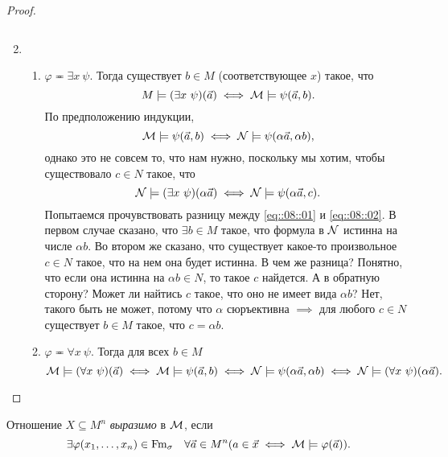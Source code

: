 \begin{proof}
\begin{enumerate}
\begin{enumerate}
$$        $$
        \end{enumerate}
        \item \begin{enumerate}
            \item $\varphi \eqcirc \exists x~ \psi$.
        Тогда существует $b \in M$ (соответствующее $x$) такое, что
        $$
            M \models (\exists x~\psi)(\vec{a}) \iff \mathcal{M} \models \psi(\vec{a}, b).
        $$
        По предположению индукции,
        \begin{equation} \label{eq::08::01}
            \mathcal{M} \models \psi(\vec{a}, b) \iff \mathcal{N} \models \psi (\alpha \vec{a}, \alpha b),
        \end{equation}
        однако это не совсем то, что нам нужно, поскольку мы хотим, чтобы существовало $c \in N$ такое, что
        \begin{equation} \label{eq::08::02}
            \mathcal{N} \models (\exists x~\psi)(\alpha \vec{a}) \iff \mathcal{N} \models \psi(\alpha \vec{a}, c).
        \end{equation}
        Попытаемся прочувствовать разницу между \eqref{eq::08::01} и \eqref{eq::08::02}.
        В первом случае сказано, что $\exists b \in M$ такое, что формула в $\mathcal{N}$ истинна на числе $\alpha b$.
        Во втором же сказано, что существует какое-то произвольное $c \in N$ такое, что на нем она будет истинна.
        В чем же разница?
        Понятно, что если она истинна на $\alpha b \in N$, то такое $c$ найдется.
        А в обратную сторону?
        Может ли найтись $c$ такое, что оно не имеет вида $\alpha b$?
        Нет, такого быть не может, потому что $\alpha$ сюръективна $\implies$ для любого $c \in N$ существует $b \in M$ такое, что $c = \alpha b$.
        \item $\varphi \eqcirc \forall x~\psi$.
        Тогда для всех $b \in M$
        $$
            \mathcal{M} \models (\forall x~\psi)(\vec{a}) \iff \mathcal{M} \models \psi(\vec{a}, b) \iff \mathcal{N} \models \psi(\alpha \vec{a}, \alpha b) \iff \mathcal{N} \models (\forall x~\psi)(\alpha \vec{a}).
        $$ \qedhere
        \end{enumerate}
    \end{enumerate}
\end{proof}

\begin{definition}
    Отношение $X \subseteq M^{n}$ {\it выразимо} в $\mathcal{M}$, если
    $$
        \exists \varphi(x_{1}, \ldots, x_{n}) \in \mathrm{Fm}_{\sigma} \quad \forall \vec{a} \in M^{n} (a \in \vec{x} \iff \mathcal{M} \models \varphi(\vec{a})).
    $$
\end{definition}

